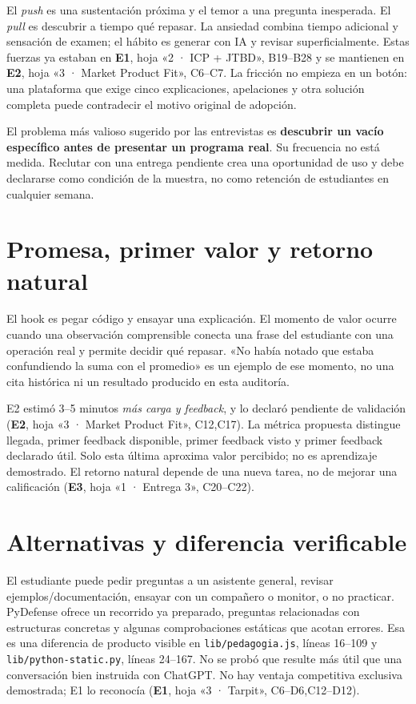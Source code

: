 \documentclass[11pt,a4paper]{report}
\newcommand{\src}[2]{\nolinkurl{#1}, líneas #2}
\newcommand{\xl}[3]{\textbf{#1}, hoja «#2», #3}
\begin{document}
El \textit{push} es una sustentación próxima y el temor a una pregunta inesperada. El \textit{pull} es descubrir a tiempo qué repasar. La ansiedad combina tiempo adicional y sensación de examen; el hábito es generar con IA y revisar superficialmente. Estas fuerzas ya estaban en \xl{E1}{2 · ICP + JTBD}{B19--B28} y se mantienen en \xl{E2}{3 · Market Product Fit}{C6--C7}. La fricción no empieza en un botón: una plataforma que exige cinco explicaciones, apelaciones y otra solución completa puede contradecir el motivo original de adopción.

El problema más valioso sugerido por las entrevistas es \textbf{descubrir un vacío específico antes de presentar un programa real}. Su frecuencia no está medida. Reclutar con una entrega pendiente crea una oportunidad de uso y debe declararse como condición de la muestra, no como retención de estudiantes en cualquier semana.

\section{Promesa, primer valor y retorno natural}
El hook es pegar código y ensayar una explicación. El momento de valor ocurre cuando una observación comprensible conecta una frase del estudiante con una operación real y permite decidir qué repasar. «No había notado que estaba confundiendo la suma con el promedio» es un ejemplo de ese momento, no una cita histórica ni un resultado producido en esta auditoría.

E2 estimó 3--5 minutos \textit{más carga y feedback}, y lo declaró pendiente de validación (\xl{E2}{3 · Market Product Fit}{C12,C17}). La métrica propuesta distingue llegada, primer feedback disponible, primer feedback visto y primer feedback declarado útil. Solo esta última aproxima valor percibido; no es aprendizaje demostrado. El retorno natural depende de una nueva tarea, no de mejorar una calificación (\xl{E3}{1 · Entrega 3}{C20--C22}).

\section{Alternativas y diferencia verificable}
El estudiante puede pedir preguntas a un asistente general, revisar ejemplos/documentación, ensayar con un compañero o monitor, o no practicar. PyDefense ofrece un recorrido ya preparado, preguntas relacionadas con estructuras concretas y algunas comprobaciones estáticas que acotan errores. Esa es una diferencia de producto visible en \src{lib/pedagogia.js}{16--109} y \src{lib/python-static.py}{24--167}. No se probó que resulte más útil que una conversación bien instruida con ChatGPT. No hay ventaja competitiva exclusiva demostrada; E1 lo reconocía (\xl{E1}{3 · Tarpit}{C6--D6,C12--D12}).
\end{document}
